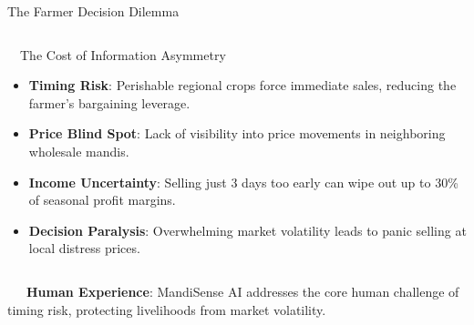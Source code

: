 \documentclass{beamer}
\begin{document}
\begin{frame}{The Farmer Decision Dilemma}
\begin{columns}[T]
    \begin{column}{0.48\textwidth}
        \begin{alertcard}[height=5.2cm]{~~The Cost of Information Asymmetry}
            \fontsize{6.8pt}{8.5pt}\selectfont
            \begin{itemize}\setlength\itemsep{4.5pt}\setlength\parskip{0pt}
                \item \textbf{Timing Risk}: Perishable regional crops force immediate sales, reducing the farmer's bargaining leverage.
                \item \textbf{Price Blind Spot}: Lack of visibility into price movements in neighboring wholesale mandis.
                \item \textbf{Income Uncertainty}: Selling just 3 days too early can wipe out up to 30\% of seasonal profit margins.
                \item \textbf{Decision Paralysis}: Overwhelming market volatility leads to panic selling at local distress prices.
            \end{itemize}
        \end{alertcard}
    \end{column}
\end{columns}

\vspace{0.15cm}
\begin{tcolorbox}[enhanced, colback=primaryblue!4, colframe=primaryblue!30, boxrule=0.35pt,
  arc=3.5pt, width=0.98\textwidth, left=4pt, right=4pt, top=2.5pt, bottom=2.5pt, boxsep=0pt,
  halign=center, shadow={0.5pt}{-0.5pt}{0pt}{black!8}]
    \fontsize{5.5pt}{6.5pt}\selectfont
    \textcolor{primaryDark}{~~~\textbf{Human Experience}: MandiSense AI addresses the core human challenge of timing risk, protecting livelihoods from market volatility.}
\end{tcolorbox}
\end{frame}
\end{document}
